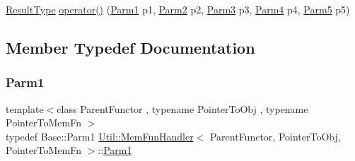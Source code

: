 \begin{DoxyCompactItemize}
\item 
\mbox{\hyperlink{classUtil_1_1MemFunHandler_a093690dcced95ad48c5429e50006c83e}{Result\+Type}} \mbox{\hyperlink{classUtil_1_1MemFunHandler_a8746a13d5fa1e938573fe80b10d84b91}{operator()}} (\mbox{\hyperlink{classUtil_1_1MemFunHandler_a43182733677fc623d89e5613ecf15761}{Parm1}} p1, \mbox{\hyperlink{classUtil_1_1MemFunHandler_a9d454c62047cb4bff3173b5bda9a38c8}{Parm2}} p2, \mbox{\hyperlink{classUtil_1_1MemFunHandler_a6cbef94d16f4d6b29d6a8a90afbeff4f}{Parm3}} p3, \mbox{\hyperlink{classUtil_1_1MemFunHandler_a1e5a0cf582f3b540e409d333ae06a4bd}{Parm4}} p4, \mbox{\hyperlink{classUtil_1_1MemFunHandler_a70d588c17500255eb899788aa0e6c29d}{Parm5}} p5)
\end{DoxyCompactItemize}


\subsection{Member Typedef Documentation}
\mbox{\label{classUtil_1_1MemFunHandler_a43182733677fc623d89e5613ecf15761}} 
\subsubsection{\texorpdfstring{Parm1}{Parm1}\hspace{0.1cm}{\footnotesize\ttfamily [1/2]}}
{\footnotesize\ttfamily template$<$class Parent\+Functor , typename Pointer\+To\+Obj , typename Pointer\+To\+Mem\+Fn $>$ \\
typedef Base\+::\+Parm1 \mbox{\hyperlink{classUtil_1_1MemFunHandler}{Util\+::\+Mem\+Fun\+Handler}}$<$ Parent\+Functor, Pointer\+To\+Obj, Pointer\+To\+Mem\+Fn $>$\+::\mbox{\hyperlink{classUtil_1_1MemFunHandler_a43182733677fc623d89e5613ecf15761}{Parm1}}}

\mbox{\label{classUtil_1_1MemFunHandler_a43182733677fc623d89e5613ecf15761}} 
